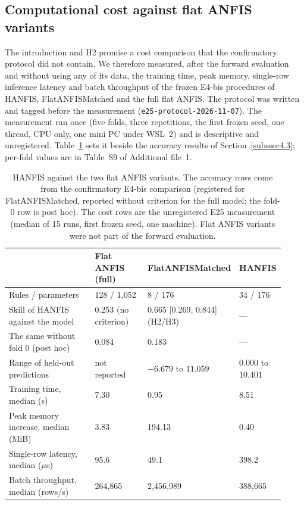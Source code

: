 \documentclass[referee,lineno,pdflatex,sn-basic]{sn-jnl}%
\theoremstyle{thmstyleone}%
\theoremstyle{thmstyletwo}%
\theoremstyle{thmstylethree}%
\begin{document}
\subsection{Computational cost against flat ANFIS variants}\label{subsec:e25}
The introduction and H2 promise a cost comparison that the confirmatory protocol did not contain. We therefore measured, after the forward evaluation and without using any of its data, the training time, peak memory, single-row inference latency and batch throughput of the frozen E4-bis procedures of HANFIS, FlatANFISMatched and the full flat ANFIS. The protocol was written and tagged before the measurement (\texttt{e25-protocol-2026-11-07}). The measurement ran once (five folds, three repetitions, the first frozen seed, one thread, CPU only, one mini PC under WSL~2) and is descriptive and unregistered. Table~\ref{tab:flat-vs-hanfis} sets it beside the accuracy results of Section~\ref{subssec4.3}; per-fold values are in Table~S9 of Additional file~1.

\begin{table}[ht]
\caption{HANFIS against the two flat ANFIS variants. The accuracy rows come from the confirmatory E4-bis comparison (registered for FlatANFISMatched, reported without criterion for the full model; the fold-0 row is post hoc). The cost rows are the unregistered E25 measurement (median of 15 runs, first frozen seed, one machine). Flat ANFIS variants were not part of the forward evaluation.}\label{tab:flat-vs-hanfis}
\footnotesize
\setlength{\tabcolsep}{4pt}
\begin{tabular}{@{}p{0.34\linewidth}p{0.20\linewidth}p{0.22\linewidth}p{0.16\linewidth}@{}}
\hline
 & Flat ANFIS (full) & FlatANFISMatched & HANFIS\\
\hline
Rules / parameters & 128 / 1{,}052 & 8 / 176 & 34 / 176\\
Skill of HANFIS against the model & 0.253 (no criterion) & 0.665 [0.269, 0.844] (H2/H3) & ---\\
The same without fold 0 (post hoc) & 0.084 & 0.183 & ---\\
Range of held-out predictions & not reported & $-6.679$ to $11.059$ & $0.000$ to $10.401$\\
Training time, median (s) & 7.30 & 0.95 & 8.51\\
Peak memory increase, median (MiB) & 3.83 & 194.13 & 0.40\\
Single-row latency, median ($\mu$s) & 95.6 & 49.1 & 398.2\\
Batch throughput, median (rows/s) & 264{,}865 & 2{,}456{,}989 & 388{,}665\\
\hline
\end{tabular}
\end{table}
\end{document}
